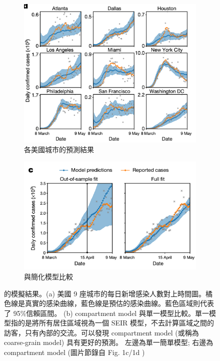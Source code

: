 
\begin{figure}[htb]
\centering 

\begin{subfigure}[b]{0.4\textwidth}
    \includegraphics[width=\textwidth]{fig/prediction/predictions.png}
     \caption{各美國城市的預測結果}
     \label{fig:pred-cities}
\end{subfigure} 
\begin{subfigure}[b]{0.4\textwidth}
    \includegraphics[width=\textwidth]{fig/prediction/compare.png}
    \caption{與簡化模型比較}
    \label{fig:pred-compare}
\end{subfigure}

\caption{\citeauthor{mobility2020} 的模擬結果。(a) 美國 9 座城市的每日新增感染人數對上時間圖。橘色線是真實的感染曲線，藍色線是預估的感染曲線。藍色區域則代表了 95$\%$信賴區間。 (b) compartment model 與單一模型比較。單一模型指的是將所有居住區域視為一個 SEIR 模型，不去計算區域之間的訪客，只有內部的交流。可以發現 compartment model (或稱為 coarse-grain model) 具有更好的預測。 左邊為單一簡單模型; 右邊為 compartment model (圖片節錄自 Fig. 1c/1d \cite{mobility2020}) }

\label{fig:pred}

\end{figure}